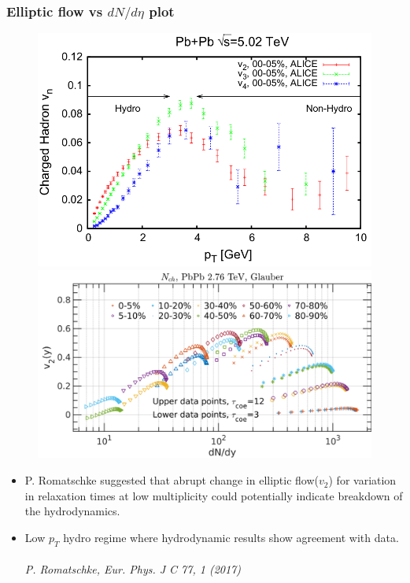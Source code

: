 \documentclass[aspectratio=1610]{beamer}
\begin{document}
\begin{frame}
\frametitle{Elliptic flow vs $dN/d\eta$ plot}

\begin{figure}
\includegraphics[scale=0.22]{figs/non_hydro.png}
\includegraphics[scale=0.22]{figs/v2_dNdy_3Dgeometric.png}
\end{figure}

\begin{itemize}

\item P. Romatschke suggested that abrupt change in elliptic flow($v_2$) for variation in relaxation times at low multiplicity could potentially indicate breakdown of the hydrodynamics.

\item Low $p_T$ hydro regime where hydrodynamic results show agreement with data.\\~\\


 \textit{P. Romatschke, Eur. Phys. J C 77, 1 (2017)}
 
\end{itemize}
\end{frame}
\end{document}

